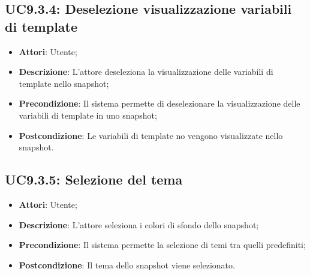 \subsection{UC9.3.4: Deselezione visualizzazione variabili di template}
\begin{itemize}
	\item \textbf{Attori}: Utente;
	\item \textbf{Descrizione}: L'attore deseleziona la visualizzazione delle variabili di template nello snapshot;
	\item \textbf{Precondizione}: Il sistema permette di deselezionare la visualizzazione delle variabili di template in uno snapshot;
	\item \textbf{Postcondizione}: Le variabili di template no vengono visualizzate nello snapshot.
\end{itemize}

\subsection{UC9.3.5: Selezione del tema}
\begin{itemize}
	\item \textbf{Attori}: Utente;
	\item \textbf{Descrizione}: L'attore seleziona i colori di sfondo dello snapshot; 
	\item \textbf{Precondizione}: Il sistema permette la selezione di temi tra quelli predefiniti;
	\item \textbf{Postcondizione}: Il tema dello snapshot viene selezionato.
\end{itemize}
